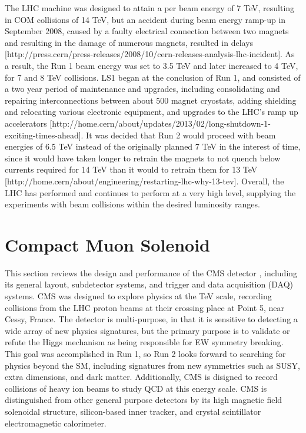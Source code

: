 \indent The LHC machine was designed to attain a per beam energy of 7 TeV, resulting in COM collisions of 14 TeV, but an accident during beam energy ramp-up in September 2008, caused by a faulty electrical connection between two magnets and resulting in the damage of numerous magnets, resulted in delays [http://press.cern/press-releases/2008/10/cern-releases-analysis-lhc-incident]. As a result, the Run 1 beam energy was set to 3.5 TeV and later increased to 4 TeV, for 7 and 8 TeV collisions. LS1 began at the conclusion of Run 1, and consisted of a two year period of maintenance and upgrades, including consolidating and repairing interconnections between about 500 magnet cryostats, adding shielding and relocating various electronic equipment, and upgrades to the LHC's ramp up accelerators [http://home.cern/about/updates/2013/02/long-shutdown-1-exciting-times-ahead]. It was decided that Run 2 would proceed with beam energies of 6.5 TeV instead of the originally planned 7 TeV in the interest of time, since it would have taken longer to retrain the magnets to not quench below currents required for 14 TeV than it would to retrain them for 13 TeV [http://home.cern/about/engineering/restarting-lhc-why-13-tev]. Overall, the LHC has performed and continues to perform at a very high level, supplying the experiments with beam collisions within the desired luminosity ranges. 

\section{Compact Muon Solenoid}

This section reviews the design and performance of the CMS detector \cite{1748-0221-3-08-S08004}, including its general layout, subdetector systems, and trigger and data acquisition (DAQ) systems. CMS was designed to explore physics at the TeV scale, recording collisions from the LHC proton beams at their crossing place at Point 5, near Cessy, France. The detector is multi-purpose, in that it is sensitive to detecting a wide array of new physics signatures, but the primary purpose is to validate or refute the Higgs mechanism as being responsible for EW symmetry breaking. This goal was accomplished in Run 1, so Run 2 looks forward to searching for physics beyond the SM, including signatures from new symmetries such as SUSY, extra dimensions, and dark matter. Additionally, CMS is disigned to record collisions of heavy ion beams to study QCD at this energy scale. CMS is distinguished from other general purpose detectors by its high magnetic field solenoidal structure, silicon-based inner tracker, and crystal scintillator electromagnetic calorimeter. 

